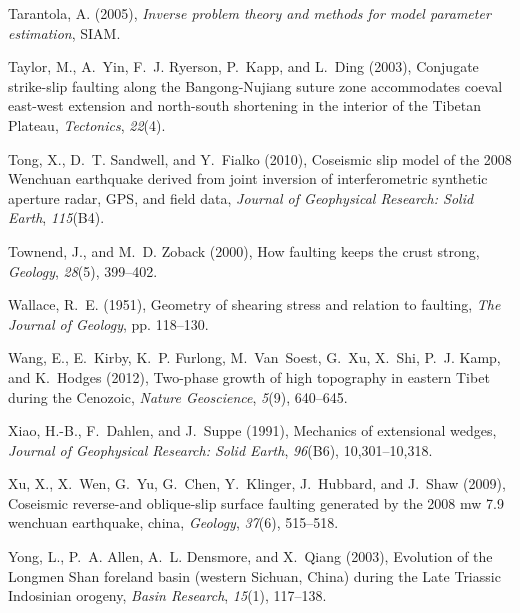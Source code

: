 \documentclass[twocolumn,jgrga]{AGUTeX}
\begin{document}
\begin{article}
{{\begin{thebibliography}{87}
Tarantola, A. (2005), \textit{Inverse problem theory and methods for model
  parameter estimation}, SIAM.

Taylor, M., A.~Yin, F.~J. Ryerson, P.~Kapp, and L.~Ding (2003), Conjugate
  strike-slip faulting along the {B}angong-{N}ujiang suture zone accommodates
  coeval east-west extension and north-south shortening in the interior of the
  {T}ibetan {P}lateau, \textit{Tectonics}, \textit{22}(4).

Tong, X., D.~T. Sandwell, and Y.~Fialko (2010), Coseismic slip model of the
  2008 {W}enchuan earthquake derived from joint inversion of interferometric
  synthetic aperture radar, {G}{P}{S}, and field data, \textit{Journal of
  Geophysical Research: Solid Earth}, \textit{115}(B4).

Townend, J., and M.~D. Zoback (2000), How faulting keeps the crust strong,
  \textit{Geology}, \textit{28}(5), 399--402.

Wallace, R.~E. (1951), Geometry of shearing stress and relation to faulting,
  \textit{The Journal of Geology}, pp. 118--130.

Wang, E., E.~Kirby, K.~P. Furlong, M.~Van~Soest, G.~Xu, X.~Shi, P.~J. Kamp, and
  K.~Hodges (2012), Two-phase growth of high topography in eastern {T}ibet
  during the {C}enozoic, \textit{Nature Geoscience}, \textit{5}(9), 640--645.

Xiao, H.-B., F.~Dahlen, and J.~Suppe (1991), Mechanics of extensional wedges,
  \textit{Journal of Geophysical Research: Solid Earth}, \textit{96}(B6),
  10,301--10,318.

Xu, X., X.~Wen, G.~Yu, G.~Chen, Y.~Klinger, J.~Hubbard, and J.~Shaw (2009),
  Coseismic reverse-and oblique-slip surface faulting generated by the 2008 mw
  7.9 wenchuan earthquake, china, \textit{Geology}, \textit{37}(6), 515--518.

Yong, L., P.~A. Allen, A.~L. Densmore, and X.~Qiang (2003), Evolution of the
  {L}ongmen {S}han foreland basin (western {S}ichuan, {C}hina) during the
  {L}ate {T}riassic {I}ndosinian orogeny, \textit{Basin Research},
  \textit{15}(1), 117--138.


\end{thebibliography}}}
\end{article}
\end{document}
